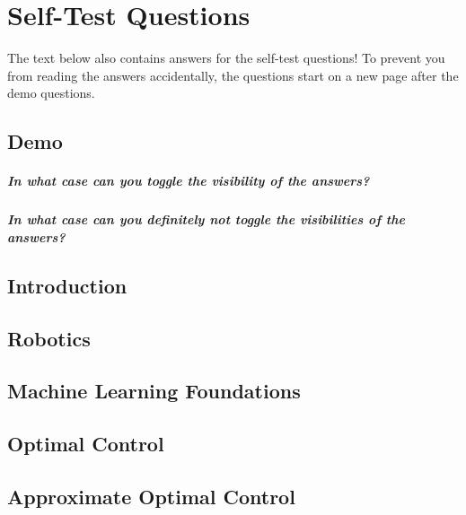 \chapter{Self-Test Questions} %
	The text below also contains answers for the self-test questions! To prevent you from reading the answers accidentally, the questions start on a new page after the demo questions.

	\section{Demo}
		\paragraph{In what case can you toggle the visibility of the answers?}

		\paragraph{In what case can you definitely not toggle the visibilities of the answers?}
	
	\newpage

	\section{Introduction} %

	\section{Robotics} %

	\section{Machine Learning Foundations} %

	\section{Optimal Control} %

	\section{Approximate Optimal Control} %

